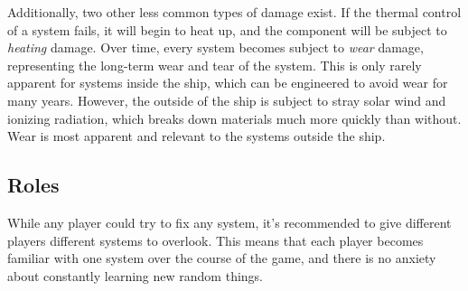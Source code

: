\documentclass[a4paper]{article}
\begin{document}
Additionally, two other less common types of damage exist. If the thermal control of a system fails, it will begin to heat up, and the component will be subject to \textit{heating} damage. Over time, every system becomes subject to \textit{wear} damage, representing the long-term wear and tear of the system. This is only rarely apparent for systems inside the ship, which can be engineered to avoid wear for many years. However, the outside of the ship is subject to stray solar wind and ionizing radiation, which breaks down materials much more quickly than without. Wear is most apparent and relevant to the systems outside the ship.

\subsection{Roles} \label{roles}

While any player could try to fix any system, it's recommended to give different players different systems to overlook. This means that each player becomes familiar with one system over the course of the game, and there is no anxiety about constantly learning new random things. 
\end{document}
